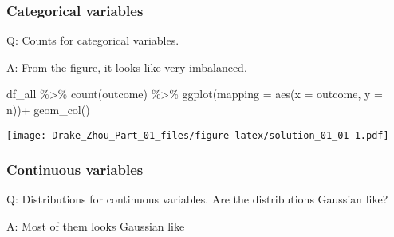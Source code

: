 \documentclass[
]{article}
\newenvironment{Shaded}{\begin{snugshade}}{\end{snugshade}}
\newcommand{\AttributeTok}[1]{\textcolor[rgb]{0.77,0.63,0.00}{#1}}
\newcommand{\FunctionTok}[1]{\textcolor[rgb]{0.00,0.00,0.00}{#1}}
\newcommand{\NormalTok}[1]{#1}
\newcommand{\SpecialCharTok}[1]{\textcolor[rgb]{0.00,0.00,0.00}{#1}}
\begin{document}
\hypertarget{categorical-variables}{%
\subsubsection{Categorical variables}\label{categorical-variables}}

Q: Counts for categorical variables.

A: From the figure, it looks like very imbalanced.

\begin{Shaded}
\begin{Highlighting}[]
\NormalTok{df\_all }\SpecialCharTok{\%\textgreater{}\%}
  \FunctionTok{count}\NormalTok{(outcome) }\SpecialCharTok{\%\textgreater{}\%}
  \FunctionTok{ggplot}\NormalTok{(}\AttributeTok{mapping =} \FunctionTok{aes}\NormalTok{(}\AttributeTok{x =}\NormalTok{ outcome, }\AttributeTok{y =}\NormalTok{ n))}\SpecialCharTok{+}
  \FunctionTok{geom\_col}\NormalTok{()}
\end{Highlighting}
\end{Shaded}

\texttt{[image: Drake\_Zhou\_Part\_01\_files/figure-latex/solution\_01\_01-1.pdf]}

\hypertarget{continuous-variables}{%
\subsubsection{Continuous variables}\label{continuous-variables}}

Q: Distributions for continuous variables. Are the distributions
Gaussian like?

A: Most of them looks Gaussian like
\end{document}
